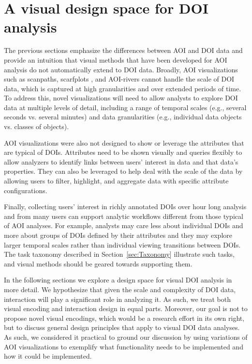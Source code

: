 \section{A visual design space for DOI analysis}
The previous sections emphasize the differences between AOI and DOI data and provide an intuition that visual methods that have been developed for AOI analysis do not automatically extend to DOI data. Broadly, AOI visualizations such as scanpaths, scarfplots , and AOI-rivers cannot handle the scale of DOI data, which is captured at high granularities and over extended periods of time. To address this, novel visualizations will need to allow analysts to explore DOI data at multiple levels of detail, including a range of temporal scales (e.g., several seconds vs. several minutes) and data granularities (e.g., individual data objects vs. classes of objects).  

AOI visualizations were also not designed to show or leverage the attributes that are typical of DOIs.  Attributes need to be shown visually and queries flexibly to allow analyzers to identify links between users' interest in data and that data's properties. They can also be leveraged to help deal with the scale of the data by allowing users to filter, highlight, and aggregate data with specific attribute configurations.

Finally, collecting users' interest in richly annotated DOIs over hour long analysis and from many users can support analytic workflows different from those typical of AOI analyses. For example, analysts may care less about individual DOIs and more about groups of DOIs defined by their attributes and they may explore larger temporal scales rather than individual viewing transitions between DOIs. The task taxonomy described in Section~\ref{sec:Taxonomy} illustrate such tasks, and visual methods should be geared towards supporting them. 

In the following sections we explore a design space for visual DOI analysis in more detail. We hypothesize that given the scale and complexity of DOI data, interaction will play a significant role in analyzing it. As such, we treat both visual encoding and interaction design in equal parts. Moreover, our goal is not to propose novel visual encodings, which would be a research effort in its own right, but to discuss general design principles that apply to visual DOI data analyses. As such, we considered it practical to ground our discussion by using variations of AOI visualizations to exemplify what functionality needs to be implemented and how it could be implemented. 

